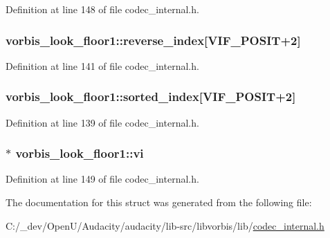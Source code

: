 Definition at line 148 of file codec\+\_\+internal.\+h.

\subsubsection[{\texorpdfstring{reverse\+\_\+index}{reverse_index}}]{ vorbis\+\_\+look\+\_\+floor1\+::reverse\+\_\+index\mbox{[}{\bf V\+I\+F\+\_\+\+P\+O\+S\+IT}+2\mbox{]}}\hypertarget{structvorbis__look__floor1_a6743f31bc487a907f36876a98a5bf0ec}{}\label{structvorbis__look__floor1_a6743f31bc487a907f36876a98a5bf0ec}


Definition at line 141 of file codec\+\_\+internal.\+h.

\subsubsection[{\texorpdfstring{sorted\+\_\+index}{sorted_index}}]{ vorbis\+\_\+look\+\_\+floor1\+::sorted\+\_\+index\mbox{[}{\bf V\+I\+F\+\_\+\+P\+O\+S\+IT}+2\mbox{]}}\hypertarget{structvorbis__look__floor1_a629f0bee40a5c9a8f644e7df69f3dadb}{}\label{structvorbis__look__floor1_a629f0bee40a5c9a8f644e7df69f3dadb}


Definition at line 139 of file codec\+\_\+internal.\+h.

\subsubsection[{\texorpdfstring{vi}{vi}}]{$\ast$ vorbis\+\_\+look\+\_\+floor1\+::vi}\hypertarget{structvorbis__look__floor1_ade3db5b54943aea50868288f4d077a34}{}\label{structvorbis__look__floor1_ade3db5b54943aea50868288f4d077a34}


Definition at line 149 of file codec\+\_\+internal.\+h.



The documentation for this struct was generated from the following file\+:\begin{DoxyCompactItemize}
\item 
C\+:/\+\_\+dev/\+Open\+U/\+Audacity/audacity/lib-\/src/libvorbis/lib/\hyperlink{codec__internal_8h}{codec\+\_\+internal.\+h}\end{DoxyCompactItemize}
